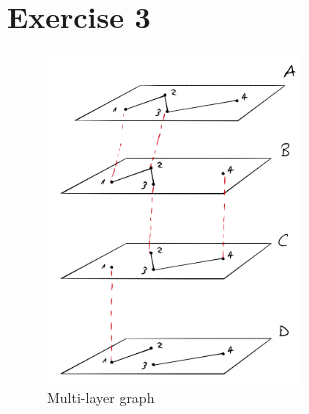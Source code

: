 \documentclass{article}
\begin{document}
\section{Exercise 3}
    \begin{figure}[H]
        \centering
        \includegraphics[width=0.6\textwidth]{4.png}
        \caption{Multi-layer graph}
        \label{fig:figure-4}
    \end{figure}
\end{document}
